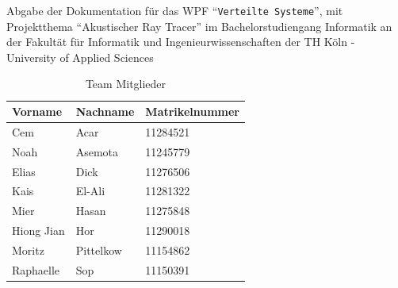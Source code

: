 \vspace*{1cm}
Abgabe der Dokumentation für das WPF \enquote{\texttt{Verteilte Systeme}}, mit Projektthema \enquote{Akustischer Ray Tracer}
im Bachelorstudiengang Informatik an der Fakultät für Informatik und Ingenieurwissenschaften der TH Köln - University of Applied Sciences


\begin{table}[htbp]
    \centering
    \caption{Team Mitglieder}
    \label{tab:team_members}
    \begin{tabular}{lll}
        \toprule
        \textbf{Vorname} & \textbf{Nachname} & \textbf{Matrikelnummer} \\
        \midrule
        Cem & Acar & 11284521 \\
        Noah & Asemota & 11245779 \\
        Elias & Dick & 11276506 \\
        Kais & El-Ali & 11281322 \\
        Mier & Hasan & 11275848 \\
        Hiong Jian & Hor & 11290018 \\
        Moritz & Pittelkow & 11154862 \\
        Raphaelle & Sop & 11150391 \\
        \bottomrule
    \end{tabular}
\end{table}
